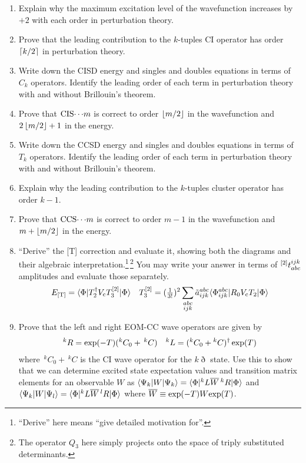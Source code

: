 \documentclass[11pt]{article}
\begin{document}
\begin{enumerate}
\item
Explain why the maximum excitation level of the wavefunction increases by $+2$ with each order in perturbation theory.

\item
Prove that the leading contribution to the $k$-tuples CI operator has order $\left\lceil k/2\right\rceil$ in perturbation theory.

\item
Write down the CISD energy and singles and doubles equations in terms of $C_k$ operators.  Identify the leading order of each term in perturbation theory with and without Brillouin's theorem.

\item
Prove that $\mathrm{CIS}{\cdots}m$ is correct to order $\left\lfloor m/2\right\rfloor$ in the wavefunction and $2\left\lfloor m/2\right\rfloor + 1$ in the energy.

\item
Write down the CCSD energy and singles and doubles equations in terms of $T_k$ operators.  Identify the leading order of each term in perturbation theory with and without Brillouin's theorem.

\item
Explain why the leading contribution to the $k$-tuples cluster operator has order $k-1$.

\item
Prove that $\mathrm{CCS}{\cdots}m$ is correct to order $m-1$ in the wavefunction and $m + \left\lfloor m/2\right\rfloor$ in the energy.

\item
``Derive'' the [T] correction and evaluate it, showing both the diagrams and their algebraic interpretation.\footnote{``Derive'' here means ``give detailed motivation for''.}\,\footnote{The operator $Q_3$ here simply projects onto the space of triply substituted determinants.}
You may write your answer in terms of ${}^{[2]}t_{abc}^{ijk}$ amplitudes and evaluate those separately.
\begin{align}
  E_{[\mathrm{T}]}
=
  \langle\Phi |T_2^\dagger V_{\mathrm{c}} T_3^{[2]}|\Phi \rangle
&&
  T_3^{[2]}
=
  (\tfrac{1}{3!})^2
  \sum_{\substack{abc\\ijk}}
  \tilde{a}_{ijk}^{abc}
  \langle\Phi _{ijk}^{abc}|
    R_0
    V_{\mathrm{c}}
    T_2
  |\Phi \rangle
\end{align}

\item
Prove that the left and right EOM-CC wave operators are given by
\begin{align}
  {}^kR
=
  \mathrm{exp}(-T)
  (
    {}^kC_0
  +
    \,{}^kC
  )
&&
  {}^kL
=
  (
    {}^kC_0
  +
    {}^kC
  )^\dagger\,
  \mathrm{exp}(T)
\end{align}
where $\,{}^kC_0+\,{}^kC$ is the CI wave operator for the $k\eth$ state.
Use this to show that we can determine excited state expectation values and transition matrix elements for an observable $W$ as
$
  \langle\Psi _k|W|\Psi _k\rangle
=
  \langle\Phi |{}^kL\overline{W}\,{}^kR|\Phi \rangle
$
and
$
  \langle\Psi _k|W|\Psi _l\rangle
=
  \langle\Phi |{}^kL\overline{W}\,{}^lR|\Phi \rangle
$
where
$
  \overline{W}
\equiv
  \mathrm{exp}(-T)
  W
  \mathrm{exp}(T)
$.


\end{enumerate}
\end{document}
